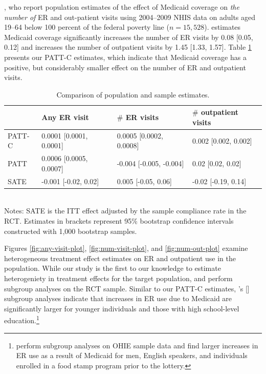 \documentclass[hidelinks,12pt]{article}
\newcommand{\possessivecite}[1]{\citeauthor{#1}'s [\citeyear{#1}]}
\begin{document}
{{\color{red}
\citet{finkelstein2012}, who report population estimates of the effect of Medicaid coverage on \emph{the number of} ER and out-patient visits using 2004--2009 NHIS data on adults aged 19--64 below 100 percent of the federal poverty line ($n=15,528$). \citet{finkelstein2012} estimates Medicaid coverage significantly increases the number of ER visits by 0.08 [0.05, 0.12] and increases the number of outpatient visits by 1.45 [1.33, 1.57]. Table \ref{compliance-compare} presents our PATT-C estimates, which indicate that Medicaid coverage has a positive, but considerably smaller effect on the number of ER and outpatient visits. }

\begin{table}[h]
	\caption{Comparison of population and sample estimates.\label{compliance-compare}} 
	\begin{tabular}{@{}llll@{}}
		\toprule
		\backslashbox{Estimator}{Outcome} 				& Any ER visit 	& $\#$ ER visits   & $\#$ outpatient visits      \\ \midrule
		PATT-C                                           & 0.0001 [0.0001, 0.0001]   & 0.0005 [0.0002, 0.0008]	& 0.002 [0.002, 0.002] \\
		PATT                                             & 0.0006 [0.0005, 0.0007]   & -0.004 [-0.005, -0.004]	& 0.02 [0.02, 0.02]  \\
		SATE                                             & -0.001 [-0.02, 0.02]   & 0.005 [-0.05, 0.06]	& -0.02 [-0.19, 0.14]  \\ \bottomrule
	\end{tabular}\\
	\footnotesize{Notes: SATE is the ITT effect adjusted by the sample compliance rate in the RCT. Estimates in brackets represent 95\% bootstrap confidence intervals constructed with 1,000 bootstrap samples.}
\end{table}

{\color{red}
Figures \ref{fig:any-visit-plot}, \ref{fig:num-visit-plot}, and \ref{fig:num-out-plot} examine heterogeneous treatment effect estimates on ER and outpatient use in the population. While our study is the first to our knowledge to estimate heterogeniety in treatment effects for the target population, \citet{Taubman} and \citet{NBERw22363} perform subgroup analyses on the RCT sample. Similar to our PATT-C estimates, \possessivecite{Taubman} subgroup analyses indicate that increases in ER use due to Medicaid are significantly larger for younger individuals and those with high school-level education.\footnote{\citet{NBERw22363} perform subgroup analyses on OHIE sample data and find larger increases in ER use as a result of Medicaid for men, English speakers, and individuals enrolled in a food stamp program prior to the lottery.}
}
}
\end{document}
